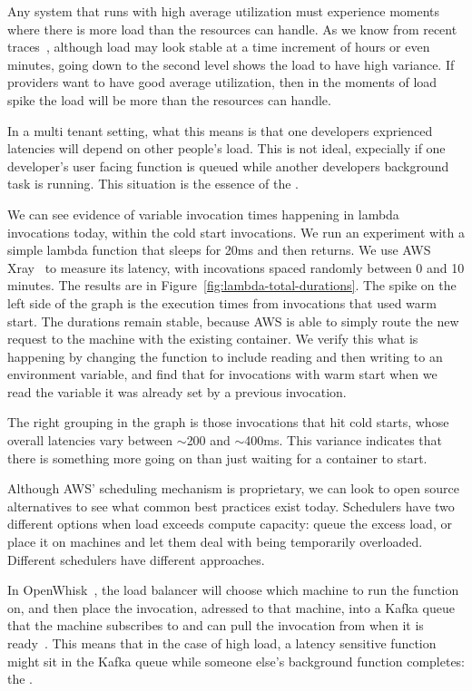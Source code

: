 Any system that runs with high average utilization must experience moments where
there is more load than the resources can handle. As we know from recent
traces~\cite{prequal}, although load may look stable at a time increment of
hours or even minutes, going down to the second level shows the load to have
high variance. If providers want to have good average utilization, then in the
moments of load spike the load will be more than the resources can handle.

In a multi tenant setting, what this means is that one developers exprienced
latencies will depend on other people's load. This is not ideal, expecially if
one developer's user facing function is queued while another developers
background task is running. This situation is the essence of the \problem{}.

We can see evidence of variable invocation times happening in lambda invocations
today, within the cold start invocations. We run an experiment with a simple
lambda function that sleeps for 20ms and then returns. We use AWS
Xray~\cite{aws-xray} to measure its latency, with incovations spaced randomly
between 0 and 10 minutes. The results are in
Figure~\ref{fig:lambda-total-durations}. The spike on the left side of the graph
is the execution times from invocations that used warm start. The durations
remain stable, because AWS is able to simply route the new request to the
machine with the existing container. We verify this what is happening by
changing the function to include reading and then writing to an environment
variable, and find that for invocations with warm start when we read the
variable it was already set by a previous invocation.

The right grouping in the graph is those invocations that hit cold starts, whose
overall latencies vary between $\sim$200 and $\sim$400ms. This variance
indicates that there is something more going on than just waiting for a
container to start.

Although AWS' scheduling mechanism is proprietary, we can look to open source
alternatives to see what common best practices exist today. Schedulers have two
different options when load exceeds compute capacity: queue the excess load, or
place it on machines and let them deal with being temporarily overloaded.
Different schedulers have different approaches. 

In OpenWhisk~\cite{openwhisk}, the load balancer will choose which machine to
run the function on, and then place the invocation, adressed to that machine,
into a Kafka queue that the machine subscribes to and can pull the invocation
from when it is ready~\cite{openwhisk-sched}. This means that in the case of
high load, a latency sensitive function might sit in the Kafka queue while
someone else's background function completes: the \problem{}. 

